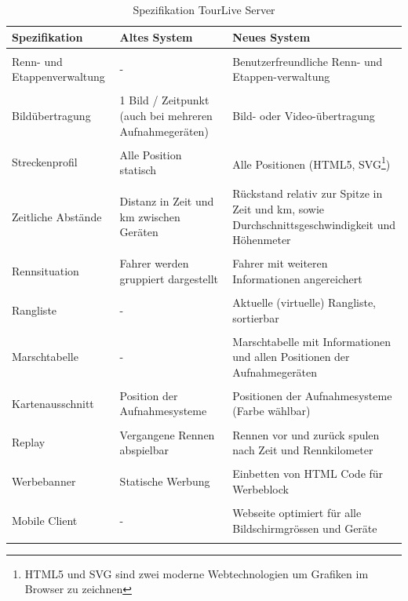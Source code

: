 \begin{longtable}{ p{3.5cm} | p{4.3cm} | p{4.3cm} }
	\textbf{Spezifikation} & \textbf{Altes System} & \textbf{Neues System} \\ [1ex] \hline \hline & & \\ [-1.5ex] Renn- und Etappenverwaltung & - & Benutzerfreundliche Renn- und Etappen-verwaltung\\ [1ex] \hline & &  \\ [-1.5ex]
Bildübertragung & 1 Bild / Zeitpunkt (auch bei mehreren Aufnahmegeräten) & Bild- oder Video-übertragung \\ [1ex] \hline & &  \\ [-1.5ex]
Streckenprofil & Alle Position statisch & Alle Positionen (HTML5, SVG\footnote{HTML5 und SVG sind zwei moderne Webtechnologien um Grafiken im Browser zu zeichnen})\\ [1ex] \hline & &  \\ [-1.5ex]
Zeitliche Abstände & Distanz in Zeit und km zwischen Geräten & Rückstand relativ zur Spitze in Zeit und km, sowie Durchschnittsgeschwindigkeit und Höhenmeter\\ [1ex] \hline & &  \\ [-1.5ex]
Rennsituation & Fahrer werden gruppiert dargestellt & Fahrer mit weiteren Informationen angereichert\\ [1ex] \hline & &  \\ [-1.5ex]
Rangliste & - & Aktuelle (virtuelle) Rangliste, sortierbar\\ [1ex] \hline & &  \\ [-1.5ex]
Marschtabelle & - & Marschtabelle mit Informationen und allen Positionen der Aufnahmegeräten\\ [1ex] \hline & &  \\ [-1.5ex]
Kartenausschnitt & Position der Aufnahmesysteme & Positionen der Aufnahmesysteme (Farbe wählbar)\\ [1ex] \hline & &  \\ [-1.5ex]
Replay & Vergangene Rennen abspielbar & Rennen vor und zurück spulen nach Zeit und Rennkilometer\\ [1ex] \hline & &  \\ [-1.5ex]
Werbebanner & Statische Werbung & Einbetten von HTML Code für Werbeblock\\ [1ex] \hline & &  \\ [-1.5ex]
Mobile Client & - & Webseite optimiert für alle Bildschirmgrössen und Geräte\\ [1ex]  

\caption{Spezifikation TourLive Server}
\label{tab:tourlivewebspeztable}
\end{longtable}

